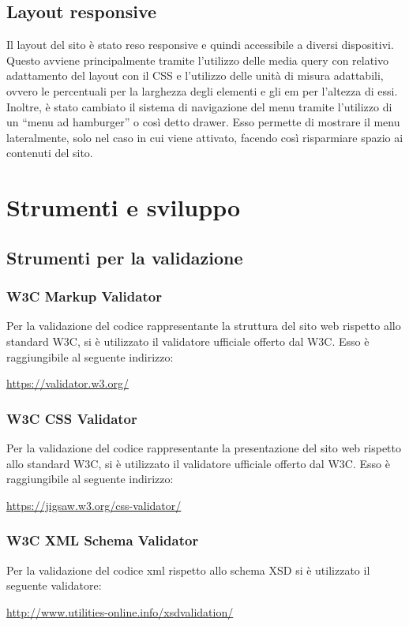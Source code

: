 	\subsection{Layout responsive}
	Il layout del sito è stato reso responsive e quindi accessibile a diversi dispositivi. Questo avviene principalmente tramite l'utilizzo delle media query con relativo adattamento del layout con il CSS e l'utilizzo delle unità di misura adattabili, ovvero le percentuali per la larghezza degli elementi e gli em per l'altezza di essi. \\
	Inoltre, è stato cambiato il sistema di navigazione del menu tramite l'utilizzo di un ``menu ad hamburger'' o così detto drawer. Esso permette di mostrare il menu lateralmente, solo nel caso in cui viene attivato, facendo così risparmiare spazio ai contenuti del sito.
\section{Strumenti e sviluppo} %
	\subsection{Strumenti per la validazione}
	
		\subsubsection{W3C Markup Validator}
		Per la validazione del codice rappresentante la struttura del sito web rispetto allo standard W3C, si è utilizzato il validatore ufficiale offerto dal W3C. Esso è raggiungibile al seguente indirizzo:
		\begin{center}
			\url{https://validator.w3.org/}
		\end{center}
		\subsubsection{W3C CSS Validator}		
		Per la validazione del codice rappresentante la presentazione del sito web rispetto allo standard W3C, si è utilizzato il validatore ufficiale offerto dal W3C. Esso è raggiungibile al seguente indirizzo:
		\begin{center}
			\url{https://jigsaw.w3.org/css-validator/}
		\end{center}
		\subsubsection{W3C XML Schema Validator}
		Per la validazione del codice xml rispetto allo schema XSD si è utilizzato il seguente validatore:
		\begin{center}
			\url{http://www.utilities-online.info/xsdvalidation/}
		\end{center}
